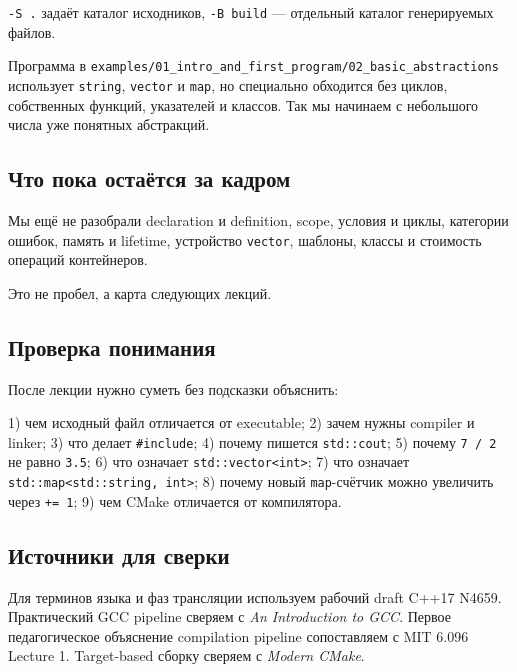 \texttt{-S .} задаёт каталог исходников, \texttt{-B build} --- отдельный
каталог генерируемых файлов.

\begin{practicebox}
Программа в
\texttt{examples/01\_intro\_and\_first\_program/02\_basic\_abstractions}
использует \texttt{string}, \texttt{vector} и \texttt{map}, но специально
обходится без циклов, собственных функций, указателей и классов.
Так мы начинаем с небольшого числа уже понятных абстракций.
\end{practicebox}

\subsection{Что пока остаётся за кадром}

Мы ещё не разобрали declaration и definition, scope, условия и циклы,
категории ошибок, память и lifetime, устройство \texttt{vector},
шаблоны, классы и стоимость операций контейнеров.

Это не пробел, а карта следующих лекций.

\subsection{Проверка понимания}

После лекции нужно суметь без подсказки объяснить:

1) чем исходный файл отличается от executable; 2) зачем нужны compiler и linker; 3) что делает \texttt{\#include}; 4) почему пишется \texttt{std::cout}; 5) почему \texttt{7 / 2} не равно \texttt{3.5}; 6) что означает \texttt{std::vector<int>}; 7) что означает \texttt{std::map<std::string, int>}; 8) почему новый \texttt{map}-счётчик можно увеличить через \texttt{+= 1}; 9) чем CMake отличается от компилятора.

\subsection{Источники для сверки}

Для терминов языка и фаз трансляции используем рабочий draft C++17 N4659.
Практический GCC pipeline сверяем с \textit{An Introduction to GCC}.
Первое педагогическое объяснение compilation pipeline сопоставляем с MIT
6.096 Lecture 1. Target-based сборку сверяем с \textit{Modern CMake}.
